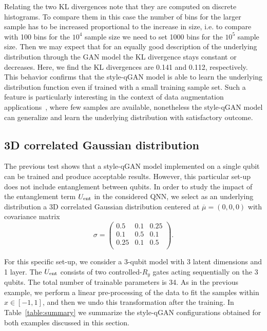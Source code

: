 \documentclass[twocolumn,preprintnumbers,superscriptaddress]{revtex4-2}
\begin{document}
Relating the two KL divergences note that they are computed on discrete histograms. To compare them in this case the number of bins for the larger sample has to be increased proportional to the increase in size, i.e. to compare with 100 bins for the $10^4$ sample size we need to set 1000 bins for the $10^5$ sample size. Then we may expect that for an equally good description of the underlying distribution through the GAN model the KL divergence stays constant or decreases.
Here, we find the KL divergences are 0.141 and 0.112, respectively. 
%
This behavior confirms that the style-qGAN model is able to learn the underlying
distribution function even if trained with a small training sample set. Such a
feature is particularly interesting in the context of data augmentation
applications~\cite{frid2018synthetic,tanaka2019data}, where few samples are
available, nonetheless the style-qGAN model can generalize and learn the underlying distribution
with satisfactory outcome.

\subsection{3D correlated Gaussian distribution}

The previous test shows that a style-qGAN model implemented on a single qubit can be
trained and produce acceptable results. However, this particular set-up does not
include entanglement between qubits. In order to study the impact of the
entanglement term $U_{\rm ent}$ in the considered QNN, we select as an
underlying distribution a 3D correlated Gaussian distribution centered at
$\overline{\mu}=(0,0,0)$ with covariance matrix
\begin{equation}
\label{eq:covmat}
  \sigma =
\begin{pmatrix}
  0.5 & 0.1 & 0.25\\
  0.1 & 0.5 & 0.1\\
  0.25 & 0.1 & 0.5\\
  \end{pmatrix}.
\end{equation}

For this specific set-up, we consider a 3-qubit model with 3 latent dimensions and
1 layer. The $U_{\rm ent}$ consists of two controlled-$R_{y}$ gates acting sequentially on the 3 qubits. The total number of trainable parameters is 34. As in the previous example, we perform a linear pre-processing of the data to fit the samples within $x \in [-1, 1]$, and then we undo this transformation after the training. In Table~\ref{table:summary}
we summarize the style-qGAN configurations obtained for both examples discussed in
this section.
\end{document}
